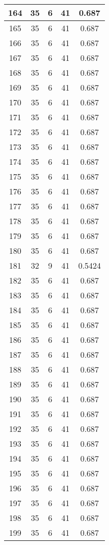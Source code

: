 \documentclass[letterpaper, 12pt]{article}
\begin{document}
\begin{longtable}{|c|c|c|c|c|}
164 & 35 & 6 & 41 & 0.687 \\
\hline
165 & 35 & 6 & 41 & 0.687 \\
\hline
166 & 35 & 6 & 41 & 0.687 \\
\hline
167 & 35 & 6 & 41 & 0.687 \\
\hline
168 & 35 & 6 & 41 & 0.687 \\
\hline
169 & 35 & 6 & 41 & 0.687 \\
\hline
170 & 35 & 6 & 41 & 0.687 \\
\hline
171 & 35 & 6 & 41 & 0.687 \\
\hline
172 & 35 & 6 & 41 & 0.687 \\
\hline
173 & 35 & 6 & 41 & 0.687 \\
\hline
174 & 35 & 6 & 41 & 0.687 \\
\hline
175 & 35 & 6 & 41 & 0.687 \\
\hline
176 & 35 & 6 & 41 & 0.687 \\
\hline
177 & 35 & 6 & 41 & 0.687 \\
\hline
178 & 35 & 6 & 41 & 0.687 \\
\hline
179 & 35 & 6 & 41 & 0.687 \\
\hline
180 & 35 & 6 & 41 & 0.687 \\
\hline
181 & 32 & 9 & 41 & 0.5424 \\
\hline
182 & 35 & 6 & 41 & 0.687 \\
\hline
183 & 35 & 6 & 41 & 0.687 \\
\hline
184 & 35 & 6 & 41 & 0.687 \\
\hline
185 & 35 & 6 & 41 & 0.687 \\
\hline
186 & 35 & 6 & 41 & 0.687 \\
\hline
187 & 35 & 6 & 41 & 0.687 \\
\hline
188 & 35 & 6 & 41 & 0.687 \\
\hline
189 & 35 & 6 & 41 & 0.687 \\
\hline
190 & 35 & 6 & 41 & 0.687 \\
\hline
191 & 35 & 6 & 41 & 0.687 \\
\hline
192 & 35 & 6 & 41 & 0.687 \\
\hline
193 & 35 & 6 & 41 & 0.687 \\
\hline
194 & 35 & 6 & 41 & 0.687 \\
\hline
195 & 35 & 6 & 41 & 0.687 \\
\hline
196 & 35 & 6 & 41 & 0.687 \\
\hline
197 & 35 & 6 & 41 & 0.687 \\
\hline
198 & 35 & 6 & 41 & 0.687 \\
\hline
199 & 35 & 6 & 41 & 0.687 \\
\hline
\end{longtable}
\end{document}
